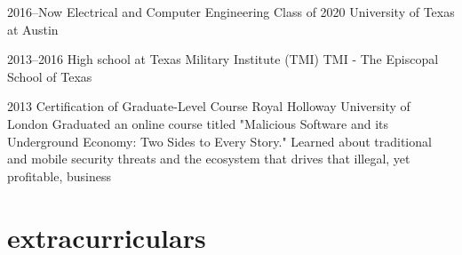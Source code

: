 \documentclass[print]{friggeri-cv} %
\begin{document}
\begin{entrylist}
	
	\vspace{-10pt}
	
	\entry
	{2016--Now}
	{Electrical and Computer Engineering Class of 2020}
	{University of Texas at Austin}
	
	
	\vspace{-10pt}
	\entry
	{2013--2016}
	{High school at Texas Military Institute (TMI)}
	{TMI - The Episcopal School of Texas}
	
	\entry
	{2013}
	{Certification of Graduate-Level Course}
	{Royal Holloway University of London}
	{Graduated an online course titled "Malicious Software and its Underground Economy: Two Sides to Every Story." Learned about traditional and mobile security threats and the ecosystem that drives that illegal, yet profitable, business}
	

	
\end{entrylist}

\section{extracurriculars}
\end{document}
